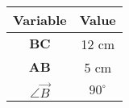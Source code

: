 \begin{center}
    \begin{tabular}{|c|c|} 
        \hline
            \textbf{Variable} & \textbf{Value} \\ 
        \hline
            $\boldsymbol{BC}$ & 12 cm \\ 
        \hline
            $\boldsymbol{AB}$ & 5 cm \\ 
        \hline
            $\angle \vec{B}$  & $90^\circ$ \\
        \hline
    \end{tabular}
\end{center}  

